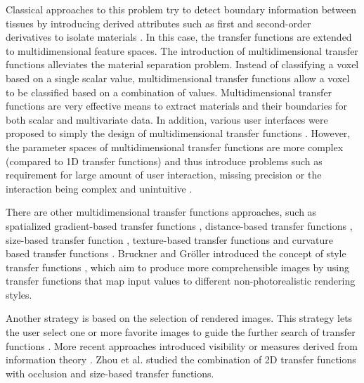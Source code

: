 Classical approaches to this problem try to detect boundary information between tissues by introducing derived attributes such as first and second-order derivatives to isolate materials \cite{kindlmann_semi-automatic_1998} \cite{kniss_multidimensional_2002}. In this case, the transfer functions are extended to multidimensional feature spaces. 
The introduction of multidimensional transfer functions alleviates the material separation problem.
Instead of classifying a voxel based on a single scalar value, multidimensional transfer functions allow a voxel to be classified based on a combination of values.
Multidimensional transfer functions are very effective means to extract materials and their boundaries for both scalar and multivariate data.
In addition, various user interfaces were proposed to simply the design of multidimensional transfer functions \cite{tzeng_novel_2003} \cite{tzeng_cluster-space_2004}.
However, the parameter spaces of multidimensional transfer functions are more complex (compared to 1D transfer functions) and thus introduce problems such as requirement for large amount of user interaction, missing precision or the interaction being complex and unintuitive \cite{arens_survey_2010}.

There are other multidimensional transfer functions approaches, such as spatialized gradient-based transfer functions \cite{roettger_spatialized_2005}, distance-based transfer functions \cite{tappenbeck_distance-based_2006}, size-based transfer function \cite{correa_size-based_2008}, texture-based transfer functions \cite{caban_texture-based_2008} \cite{alper_selver_exploring_2015} and curvature based transfer functions \cite{kindlmann_curvature-based_2003}.
Bruckner and Gr{\"o}ller introduced the concept of style transfer functions \cite{bruckner_style_2007}, which aim to produce more comprehensible images by using transfer functions that map input values to different non-photorealistic rendering styles.

Another strategy is based on the selection of rendered images. This strategy lets the user select one or more favorite images to guide the further search of transfer functions \cite{marks_design_1997} \cite{wu_interactive_2007}. More recent approaches introduced visibility \cite{correa_visibility-driven_2009} \cite{correa_visibility_2011} or measures derived from information theory \cite{haidacher_information-based_2008} \cite{bruckner_isosurface_2010} \cite{ruiz_automatic_2011} \cite{bramon_information_2013}. Zhou et al. \cite{zhou_transfer_2012} studied the combination of 2D transfer functions with occlusion and size-based transfer functions.

